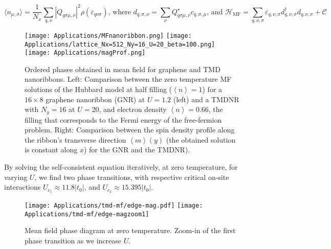 \begin{equation}
\big\langle n_{\mu, \sigma} \big\rangle = \frac{1}{N_x}\sum_{q, \nu} | Q_{q \sigma \mu, \nu} |^2 \rho ( \varepsilon_{q \nu \sigma} ) , \, \text{where} \,\, d_{q, \sigma, \nu} = \sum_\nu Q_{q \sigma \mu, \nu}^\star c_{q ,\sigma, \mu} ,  \, \text{and} \,\, \mathcal{H}_{\text{MF}} = \sum_{q, \nu, \sigma} \varepsilon_{q, \nu, \sigma} d_{q, \nu, \sigma}^\dagger d_{q, \nu, \sigma} + \mathcal{C}
\end{equation}
\begin{figure}[H]
\hspace{0.1cm}
\texttt{[image: Applications/MFnanoribbon.png]}
\hspace{0.05cm}
\texttt{[image: Applications/lattice\_Nx=512\_Ny=16\_U=20\_beta=100.png]}
\hspace{1cm}
\texttt{[image: Applications/magProf.png]}
	\caption[Comparison between the zero temperature MF solutions of the Hubbard model for a graphene nanoribbon(GNR) and a \acs{TMDNR}. Spin density profile along the ribbon's transverse direction.]{Ordered phases obtained in mean field for graphene and \ac{TMD} nanoribbons. Left: Comparison between the zero temperature MF solutions of the Hubbard model at half filling ($\left\langle n \right\rangle = 1$) for a $16 \times 8$ graphene nanoribbon (GNR) at $U=1.2$ (left) and a  \acs{TMDNR} with $N_y = 16$ at $U = 20$, and electron density $\left\langle n \right\rangle = 0.66$, the filling that corresponds to the Fermi energy of the free-fermion problem.
	Right: Comparison between the spin density profile along the ribbon's transverse direction $\left\langle m \right\rangle (y)$ (the obtained solution is constant along $x$) for the GNR and the \acs{TMDNR}).}
	\label{fig:nanoGraphVsTMD}
\end{figure}
By solving the self-consistent equation iteratively, at zero temperature, for varying $U$, we find two phase transitions, with respective critical on-site interactions $U_{c_1} \approx 11.8 |t_0|$, and $U_{c_2} \approx 15.395 |t_0|$.
\begin{figure}[H]
\texttt{[image: Applications/tmd-mf/edge-mag.pdf]}
\hspace{0.5cm}
\texttt{[image: Applications/tmd-mf/edge-magzoom1]}
	\caption[Mean field phase diagram at zero temperature. Zoom-in of the first phase transition as we increase $U$.]{Mean field phase diagram at zero temperature. Zoom-in of the first phase transition as we increase $U$.
	\label{fig:zeroTphaseDiagram}}
\end{figure}
